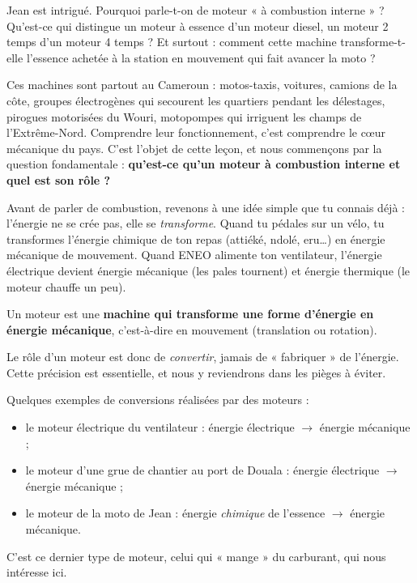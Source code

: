 \documentclass[11pt]{article}
\newcommand{\cle}[1]{{\popxbold\color{popdark}#1}}
\newcounter{popsec}
\newcounter{popsub}
\newcommand{\courssub}[1]{%
  \stepcounter{popsub}%
  \par\vspace{9pt}\noindent{\popxbold\fontsize{11.5}{13}\selectfont\color{popink}{\color{poporange}\thepopsec.\thepopsub}\hspace{6pt}#1}\par\nopagebreak\vspace{4pt}
}
\begin{document}
Jean est intrigué. Pourquoi parle-t-on de moteur « à \cle{combustion interne} » ? Qu'est-ce qui distingue un moteur à essence d'un moteur diesel, un moteur 2 temps d'un moteur 4 temps ? Et surtout : comment cette machine transforme-t-elle l'essence achetée à la station en mouvement qui fait avancer la moto ?

Ces machines sont partout au Cameroun : motos-taxis, voitures, camions de la côte, groupes électrogènes qui secourent les quartiers pendant les délestages, pirogues motorisées du Wouri, motopompes qui irriguent les champs de l'Extrême-Nord. Comprendre leur fonctionnement, c'est comprendre le cœur mécanique du pays. C'est l'objet de cette leçon, et nous commençons par la question fondamentale : \textbf{qu'est-ce qu'un moteur à combustion interne et quel est son rôle ?}

\courssub{Rappel : qu'est-ce qu'un moteur ?}

Avant de parler de combustion, revenons à une idée simple que tu connais déjà : l'\cle{énergie} ne se crée pas, elle se \emph{transforme}. Quand tu pédales sur un vélo, tu transformes l'énergie chimique de ton repas (attiéké, ndolé, eru\ldots) en énergie mécanique de mouvement. Quand ENEO alimente ton ventilateur, l'énergie électrique devient énergie mécanique (les pales tournent) et énergie thermique (le moteur chauffe un peu).

\begin{definition}[Moteur]
Un \cle{moteur} est une \textbf{machine qui transforme une forme d'énergie en énergie mécanique}, c'est-à-dire en mouvement (translation ou rotation).
\end{definition}

Le rôle d'un moteur est donc de \emph{convertir}, jamais de « fabriquer » de l'énergie. Cette précision est essentielle, et nous y reviendrons dans les pièges à éviter.

Quelques exemples de conversions réalisées par des moteurs :
\begin{itemize}
\item le moteur électrique du ventilateur : énergie électrique $\rightarrow$ énergie mécanique ;
\item le moteur d'une grue de chantier au port de Douala : énergie électrique $\rightarrow$ énergie mécanique ;
\item le moteur de la moto de Jean : énergie \emph{chimique} de l'essence $\rightarrow$ énergie mécanique.
\end{itemize}

C'est ce dernier type de moteur, celui qui « mange » du carburant, qui nous intéresse ici.
\end{document}
